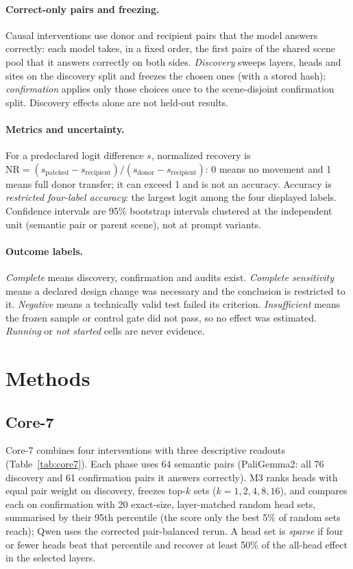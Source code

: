 \documentclass[11pt]{article}
\newcommand{\nr}{\mathrm{NR}}
\begin{document}
\paragraph{Correct-only pairs and freezing.} Causal interventions use donor and recipient pairs that the model answers correctly: each model takes, in a fixed order, the first pairs of the shared scene pool that it answers correctly on both sides. \emph{Discovery} sweeps layers, heads and sites on the discovery split and freezes the chosen ones (with a stored hash); \emph{confirmation} applies only those choices once to the scene-disjoint confirmation split. Discovery effects alone are not held-out results.

\paragraph{Metrics and uncertainty.} For a predeclared logit difference $s$, normalized recovery is $\nr=(s_{\mathrm{patched}}-s_{\mathrm{recipient}})/(s_{\mathrm{donor}}-s_{\mathrm{recipient}})$: 0 means no movement and 1 means full donor transfer; it can exceed 1 and is not an accuracy. Accuracy is \emph{restricted four-label accuracy}: the largest logit among the four displayed labels. Confidence intervals are 95\% bootstrap intervals clustered at the independent unit (semantic pair or parent scene), not at prompt variants.

\paragraph{Outcome labels.} \emph{Complete} means discovery, confirmation and audits exist. \emph{Complete sensitivity} means a declared design change was necessary and the conclusion is restricted to it. \emph{Negative} means a technically valid test failed its criterion. \emph{Insufficient} means the frozen sample or control gate did not pass, so no effect was estimated. \emph{Running} or \emph{not started} cells are never evidence.

\section{Methods}

\subsection{Core-7}

Core-7 combines four interventions with three descriptive readouts (Table~\ref{tab:core7}). Each phase uses 64 semantic pairs (PaliGemma2: all 76 discovery and 61 confirmation pairs it answers correctly). M3 ranks heads with equal pair weight on discovery, freezes top-$k$ sets ($k=1,2,4,8,16$), and compares each on confirmation with 20 exact-size, layer-matched random head sets, summarised by their 95th percentile (the score only the best 5\% of random sets reach); Qwen uses the corrected pair-balanced rerun. A head set is \emph{sparse} if four or fewer heads beat that percentile and recover at least 50\% of the all-head effect in the selected layers.
\end{document}
